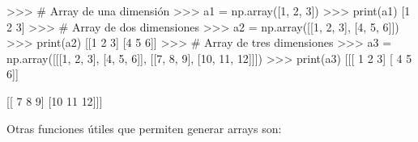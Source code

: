 \documentclass[
  spanish,
  a4paper,
]{scrreport}
\newenvironment{Shaded}{\begin{snugshade}}{\end{snugshade}}
\newcommand{\BuiltInTok}[1]{\textcolor[rgb]{0.00,0.23,0.31}{#1}}
\newcommand{\CommentTok}[1]{\textcolor[rgb]{0.37,0.37,0.37}{#1}}
\newcommand{\DecValTok}[1]{\textcolor[rgb]{0.68,0.00,0.00}{#1}}
\newcommand{\NormalTok}[1]{\textcolor[rgb]{0.00,0.23,0.31}{#1}}
\newcommand{\OperatorTok}[1]{\textcolor[rgb]{0.37,0.37,0.37}{#1}}
\begin{document}
\begin{Shaded}
\begin{Highlighting}[]
\OperatorTok{\textgreater{}\textgreater{}\textgreater{}} \CommentTok{\# Array de una dimensión}
\OperatorTok{\textgreater{}\textgreater{}\textgreater{}}\NormalTok{ a1 }\OperatorTok{=}\NormalTok{ np.array([}\DecValTok{1}\NormalTok{, }\DecValTok{2}\NormalTok{, }\DecValTok{3}\NormalTok{])}
\OperatorTok{\textgreater{}\textgreater{}\textgreater{}} \BuiltInTok{print}\NormalTok{(a1)}
\NormalTok{[}\DecValTok{1} \DecValTok{2} \DecValTok{3}\NormalTok{]}
\OperatorTok{\textgreater{}\textgreater{}\textgreater{}} \CommentTok{\# Array de dos dimensiones}
\OperatorTok{\textgreater{}\textgreater{}\textgreater{}}\NormalTok{ a2 }\OperatorTok{=}\NormalTok{ np.array([[}\DecValTok{1}\NormalTok{, }\DecValTok{2}\NormalTok{, }\DecValTok{3}\NormalTok{], [}\DecValTok{4}\NormalTok{, }\DecValTok{5}\NormalTok{, }\DecValTok{6}\NormalTok{]])}
\OperatorTok{\textgreater{}\textgreater{}\textgreater{}} \BuiltInTok{print}\NormalTok{(a2)}
\NormalTok{[[}\DecValTok{1} \DecValTok{2} \DecValTok{3}\NormalTok{]}
\NormalTok{ [}\DecValTok{4} \DecValTok{5} \DecValTok{6}\NormalTok{]]}
\OperatorTok{\textgreater{}\textgreater{}\textgreater{}} \CommentTok{\# Array de tres dimensiones}
\OperatorTok{\textgreater{}\textgreater{}\textgreater{}}\NormalTok{ a3 }\OperatorTok{=}\NormalTok{ np.array([[[}\DecValTok{1}\NormalTok{, }\DecValTok{2}\NormalTok{, }\DecValTok{3}\NormalTok{], [}\DecValTok{4}\NormalTok{, }\DecValTok{5}\NormalTok{, }\DecValTok{6}\NormalTok{]], [[}\DecValTok{7}\NormalTok{, }\DecValTok{8}\NormalTok{, }\DecValTok{9}\NormalTok{], [}\DecValTok{10}\NormalTok{, }\DecValTok{11}\NormalTok{, }\DecValTok{12}\NormalTok{]]])}
\OperatorTok{\textgreater{}\textgreater{}\textgreater{}} \BuiltInTok{print}\NormalTok{(a3)}
\NormalTok{[[[ }\DecValTok{1}  \DecValTok{2}  \DecValTok{3}\NormalTok{]}
\NormalTok{  [ }\DecValTok{4}  \DecValTok{5}  \DecValTok{6}\NormalTok{]]}

\NormalTok{ [[ }\DecValTok{7}  \DecValTok{8}  \DecValTok{9}\NormalTok{]}
\NormalTok{  [}\DecValTok{10} \DecValTok{11} \DecValTok{12}\NormalTok{]]]}
\end{Highlighting}
\end{Shaded}

Otras funciones útiles que permiten generar arrays son:
\end{document}

